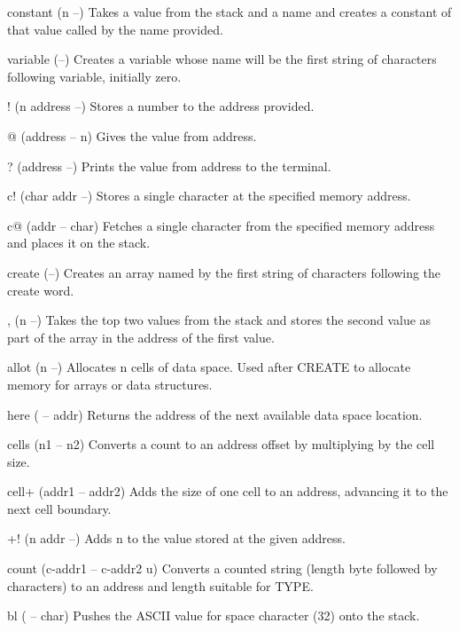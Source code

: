 \documentclass[a4paper, 11pt, openany]{book}
\begin{document}
\begin{forthbox}
  constant (n --)
           Takes a value from the stack and a name and creates a
           constant of that value called by the name provided.

  variable (--)
           Creates a variable whose name will be the first string
           of characters following variable, initially zero.

  !        (n address --)
           Stores a number to the address provided.

  @        (address -- n)
           Gives the value from address.

  ?        (address --)
           Prints the value from address to the terminal.

  c!       (char addr --)
           Stores a single character at the specified memory
           address.

  c@       (addr -- char)
           Fetches a single character from the specified memory
           address and places it on the stack.

  create   (--)
           Creates an array named by the first string of
           characters following the create word.

  ,        (n --)
           Takes the top two values from the stack and stores the
           second value as part of the array in the address of
           the first value.

  allot    (n --)
           Allocates n cells of data space. Used after CREATE to
           allocate memory for arrays or data structures.

  here     ( -- addr)
           Returns the address of the next available data space
           location.

  cells    (n1 -- n2)
           Converts a count to an address offset by multiplying
           by the cell size.

  cell+    (addr1 -- addr2)
           Adds the size of one cell to an address, advancing it
           to the next cell boundary.

  +!       (n addr --)
           Adds n to the value stored at the given address.

  count    (c-addr1 -- c-addr2 u)
           Converts a counted string (length byte followed by
           characters) to an address and length suitable for TYPE.

  bl       ( -- char)
           Pushes the ASCII value for space character (32) onto
           the stack.


\end{forthbox}
\end{document}
